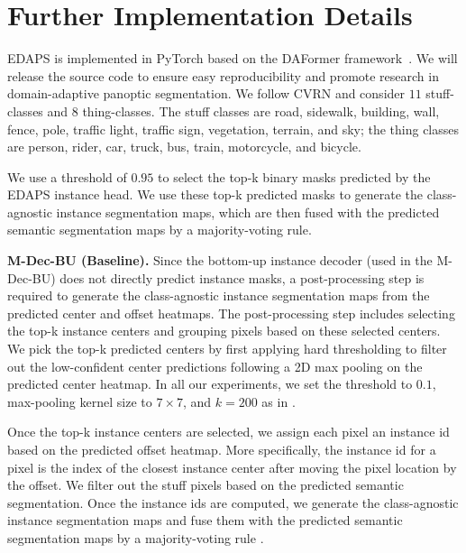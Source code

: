 \documentclass[10pt,twocolumn,letterpaper]{article}
\begin{document}
\section{Further Implementation Details}
\label{sec:further_impl_details}
EDAPS is implemented in PyTorch \cite{paszke2017automatic} based on the DAFormer framework~\cite{hoyer2021daformer}.
We will release the source code to ensure easy reproducibility and promote research in domain-adaptive panoptic segmentation.
We follow CVRN \cite{huang2021cross} and consider $11$ stuff-classes and $8$ thing-classes.
The stuff classes are road, sidewalk, building, wall, fence, pole, traffic light, traffic sign, vegetation, terrain, and sky;
the thing classes are person, rider, car, truck, bus, train, motorcycle, and bicycle. 

We use a threshold of $0.95$ to select the top-k binary masks predicted by the EDAPS instance head.
We use these top-k predicted masks to generate the class-agnostic instance segmentation maps, which are then fused with the predicted semantic segmentation maps by a majority-voting rule.

\textbf{M-Dec-BU (Baseline).}
Since the bottom-up instance decoder (used in the M-Dec-BU) does not directly predict instance masks,
a post-processing step is required to generate the class-agnostic instance segmentation maps 
from the predicted center and offset heatmaps. 
The post-processing step includes selecting the top-k instance centers and
grouping pixels based on these selected centers.
We pick the top-k predicted centers by first applying hard thresholding to filter out the low-confident center predictions following a 2D max pooling on the predicted center heatmap.
In all our experiments, 
we set the threshold to $0.1$,
max-pooling kernel size to $7 \times 7$,
and $k = 200$ as in \cite{cheng2019panoptic}.

Once the top-k instance centers are selected, 
we assign each pixel an instance id based on the predicted offset heatmap. 
More specifically, the instance id for a pixel is the index of the closest instance center 
after moving the pixel location by the offset.
We filter out the stuff pixels based on the predicted semantic segmentation.
Once the instance ids are computed, 
we generate the class-agnostic instance segmentation maps and 
fuse them with the predicted semantic segmentation maps by a majority-voting rule \cite{cheng2019panoptic}.
\end{document}
